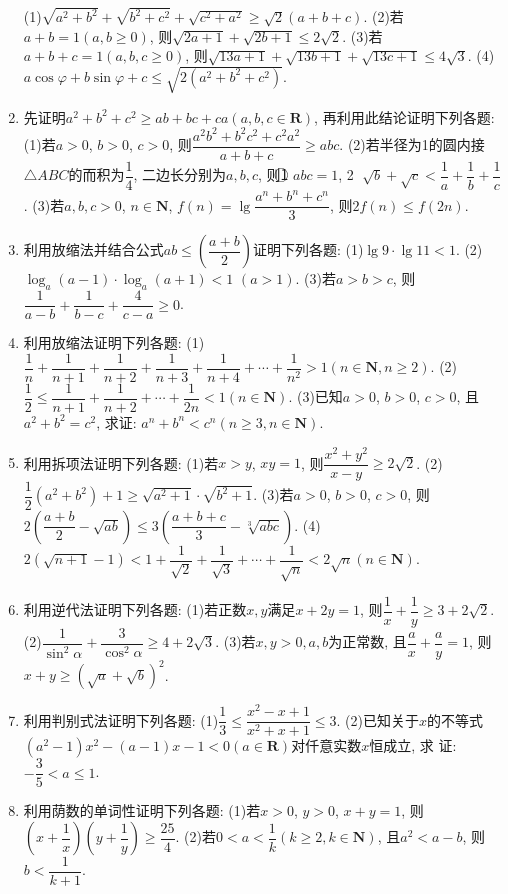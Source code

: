 \documentclass[10pt,a4paper]{article}
\begin{document}
\begin{enumerate}[1.]
    (1)$\sqrt{{a^2}+{b^2}}+\sqrt{{b^2}+{c^2}}+\sqrt{{c^2}+{a^2}}\ge \sqrt 2(a+b+c)$.
    (2)若$a+b=1(a,b\ge 0)$, 则$\sqrt{2a+1}+\sqrt{2b+1}\le 2\sqrt 2$.
    (3)若$a+b+c=1(a,b,c\ge 0)$, 则$\sqrt{13a+1}+\sqrt{13b+1}+\sqrt{13c+1}\le 4\sqrt 3$.
    (4)$a\cos \varphi +b\sin \varphi +c\le \sqrt{2({a^2}+{b^2}+{c^2})}$.
    \item 先证明$a^2+b^2+c^2\ge ab+bc+ca(a,b,c\in \mathbf{R})$, 再利用此结论证明下列各题:
    (1)若$a>0$, $b>0$, $c>0$, 则$\dfrac{{a^2}{b^2}+{b^2}{c^2}+{c^2}{a^2}}{a+b+c}\ge abc$.
    (2)若半径为1的圆内接$\triangle ABC$的而积为$\dfrac 14$, 二边长分别为$a,b,c$, 则\textcircled{1} $abc=1$, \textcircled{2} $\sqrt b+\sqrt c<\dfrac 1a+\dfrac 1b+\dfrac 1c$.
    (3)若$a,b,c>0$, $n\in \mathbf{N}$, $f(n)=\lg \dfrac{{a^n}+{b^n}+{c^n}}3$, 则$2f(n)\le f(2n)$.
    \item 利用放缩法并结合公式$ab\le (\dfrac{a+b}2)$证明下列各题:
    (1)$\lg 9\cdot \lg 11<1$.
    (2)$\log_a(a-1)\cdot \log_a(a+1)<1$ $(a>1)$.
    (3)若$a>b>c$, 则$\dfrac 1{a-b}+\dfrac 1{b-c}+\dfrac 4{c-a}\ge 0$.
    \item 利用放缩法证明下列各题:
    (1)$\dfrac 1n+\dfrac 1{n+1}+\dfrac 1{n+2}+\dfrac 1{n+3}+\dfrac 1{n+4}+\cdots +\dfrac 1{n^2}>1(n\in \mathbf{N},n\ge 2)$.
    (2)$\dfrac 12\le \dfrac 1{n+1}+\dfrac 1{n+2}+\cdots +\dfrac 1{2n}<1(n\in \mathbf{N})$.
    (3)已知$a>0$, $b>0$, $c>0$, 且$a^2+b^2=c^2$, 求证: $a^n+b^n<c^n(n\ge 3,n\in \mathbf{N})$.
    \item 利用拆项法证明下列各题:
    (1)若$x>y$, $xy=1$, 则$\dfrac{{x^2}+{y^2}}{x-y}\ge 2\sqrt 2$.
    (2)$\dfrac 12({a^2}+{b^2})+1\ge \sqrt{{a^2}+1}\cdot \sqrt{{b^2}+1}$.
    (3)若$a>0$, $b>0$, $c>0$, 则$2(\dfrac{a+b}2-\sqrt{ab})\le 3(\dfrac{a+b+c}3-\sqrt[3]{abc})$.
    (4)$2(\sqrt{n+1}-1)<1+\dfrac 1{\sqrt 2}+\dfrac 1{\sqrt 3}+\cdots +\dfrac 1{\sqrt n}<2\sqrt n(n\in \mathbf{N})$.
    \item 利用逆代法证明下列各题:
    (1)若正数$x,y$满足$x+2y=1$, 则$\dfrac 1x+\dfrac 1y\ge 3+2\sqrt 2$.
    (2)$\dfrac 1{{{\sin }^2}\alpha }+\dfrac 3{{{\cos }^2}\alpha }\ge 4+2\sqrt 3$.
    (3)若$x,y>0,a,b$为正常数, 且$\dfrac ax+\dfrac ay=1$, 则$x+y\ge (\sqrt a+\sqrt b)^2$.
    \item 利用判别式法证明下列各题:
    (1)$\dfrac 13\le \dfrac{{x^2}-x+1}{{x^2}+x+1}\le 3$.
    (2)已知关于$x$的不等式$(a^2-1)x^2-(a-1)x-1<0(a\in \mathbf{R})$对仟意实数$x$恒成立, 求    证: $-\dfrac 35<a\le 1$.
    \item 利用荫数的单词性证明下列各题:
    (1)若$x>0$, $y>0$, $x+y=1$, 则$(x+\dfrac 1x)(y+\dfrac 1y)\ge \dfrac{25}4$.
    (2)若$0<a<\dfrac 1k(k\ge 2,k\in \mathbf{N})$, 且$a^2<a-b$, 则$b<\dfrac 1{k+1}$.

\end{enumerate}
\end{document}
